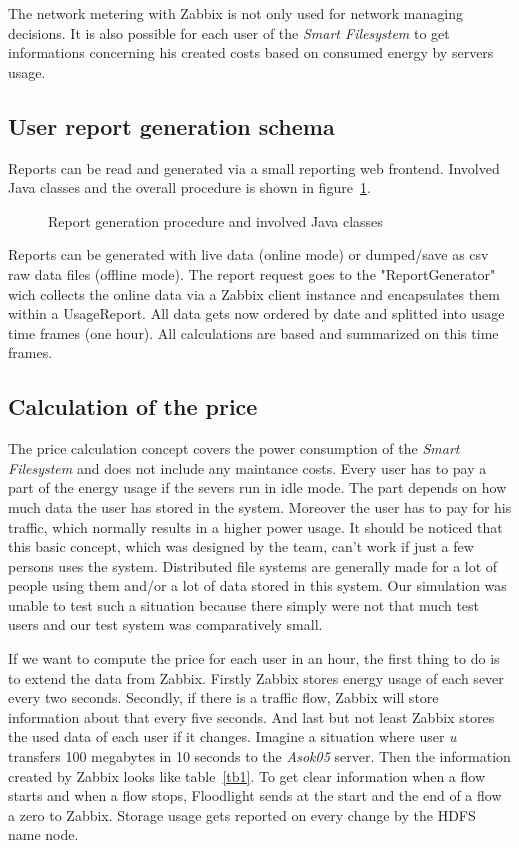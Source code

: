 The network metering with Zabbix is not only used for network managing decisions. It is also possible for each user of the \textit{Smart Filesystem} to get informations concerning his created costs based on consumed energy by servers usage.

\subsection{User report generation schema}
  Reports can be read and generated via a small reporting web frontend. Involved Java classes and the overall procedure is shown in figure~\ref{akt}.

 \begin{figure}
 \centering
 
 \caption{Report generation procedure and involved Java classes}
 \label{akt}
 \end{figure}

 Reports can be generated with live data (online mode) or dumped/save as csv raw data files (offline mode). The report request goes to the "ReportGenerator" wich collects the online data via a Zabbix client instance and encapsulates them within a UsageReport. All data gets now ordered by date and splitted into usage time frames (one hour). All calculations are based and summarized on this time frames.
 
 \subsection{Calculation of the price} 
 The price calculation concept covers the power consumption of the \textit{Smart Filesystem} and does not include any maintance costs.
 Every user has to pay a part of the energy usage if the severs run in idle mode. The part depends on how much data the user has stored in the system. Moreover the user has to pay for his traffic, which normally results in a higher power usage. It should be noticed that this basic concept, which was designed by the team, can't work if just a few persons uses the system. Distributed file systems are generally made for a lot of people using them and/or a lot of data stored in this system. Our simulation was unable to test such a situation because there simply were not that much test users and our test system was comparatively small. 
 
 If we want to compute the price for each user in an hour, the first thing to do is to extend the data from Zabbix. Firstly Zabbix stores energy usage of each sever every two seconds. Secondly, if there is a traffic flow, Zabbix will store information about that every five seconds. And last but not least Zabbix stores the used data of each user if it changes. Imagine a situation where user \textit{u} transfers 100 megabytes in 10 seconds to the \textit{Asok05} server. Then the information created by Zabbix looks like table~\ref{tb1}. 
 To get clear information when a flow starts and when a flow stops, Floodlight sends at the start and the end of a flow a zero to Zabbix. Storage usage gets reported on every change by the HDFS name node.

